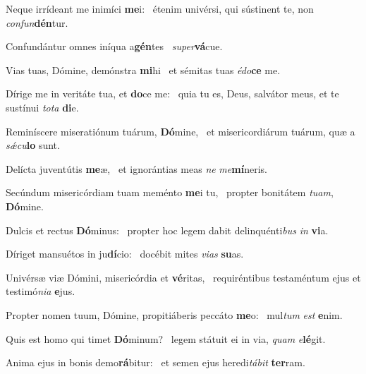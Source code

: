 \item Neque irrídeant me inimíci \textbf{me}i:~\psstar{} étenim univérsi, qui sústinent te, non \textit{con}\textit{fun}\textbf{dén}tur.

\item Confundántur omnes iníqua a\textbf{gén}tes~\psstar{} \textit{su}\textit{per}\textbf{vá}cue.

\item Vias tuas, Dómine, demónstra \textbf{mi}hi~\psstar{} et sémitas tuas \textit{é}\textit{do}\textbf{ce} me.

\item Dírige me in veritáte tua, et \textbf{do}ce me:~\psstar{} quia tu es, Deus, salvátor meus, et te sustínui \textit{to}\textit{ta} \textbf{di}e.

\item Reminíscere miseratiónum tuárum, \textbf{Dó}mine,~\psstar{} et misericordiárum tuárum, quæ a \textit{sǽ}\textit{cu}\textbf{lo} sunt.

\item Delícta juventútis \textbf{me}æ,~\psstar{} et ignorántias meas \textit{ne} \textit{me}\textbf{mí}neris.

\item Secúndum misericórdiam tuam meménto \textbf{me}i tu,~\psstar{} propter bonitátem \textit{tu}\textit{am}, \textbf{Dó}mine.

\item Dulcis et rectus \textbf{Dó}minus:~\psstar{} propter hoc legem dabit delinquénti\textit{bus} \textit{in} \textbf{vi}a.

\item Díriget mansuétos in ju\textbf{dí}cio:~\psstar{} docébit mites \textit{vi}\textit{as} \textbf{su}as.

\item Univérsæ viæ Dómini, misericórdia et \textbf{vé}ritas,~\psstar{} requiréntibus testaméntum ejus et testimó\textit{ni}\textit{a} \textbf{e}jus.

\item Propter nomen tuum, Dómine, propitiáberis peccáto \textbf{me}o:~\psstar{} mul\textit{tum} \textit{est} \textbf{e}nim.

\item Quis est homo qui timet \textbf{Dó}minum?~\psstar{} legem státuit ei in via, \textit{quam} \textit{e}\textbf{lé}git.

\item Anima ejus in bonis demo\textbf{rá}bitur:~\psstar{} et semen ejus heredi\textit{tá}\textit{bit} \textbf{ter}ram.

